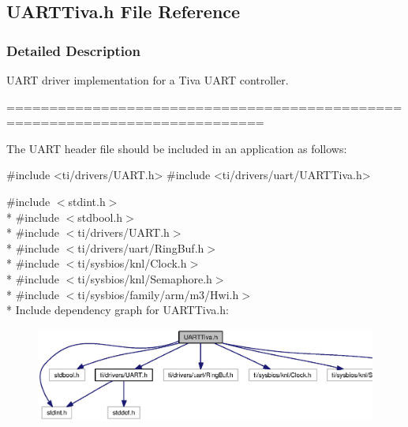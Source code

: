 \subsection{U\+A\+R\+T\+Tiva.\+h File Reference}
\label{_u_a_r_t_tiva_8h}


\subsubsection{Detailed Description}
U\+A\+R\+T driver implementation for a Tiva U\+A\+R\+T controller. 

============================================================================

The U\+A\+R\+T header file should be included in an application as follows\+: 
\begin{DoxyCode}
\textcolor{preprocessor}{#include <ti/drivers/UART.h>}
\textcolor{preprocessor}{#include <ti/drivers/uart/UARTTiva.h>}
\end{DoxyCode}
 

{\ttfamily \#include $<$stdint.\+h$>$}\\*
{\ttfamily \#include $<$stdbool.\+h$>$}\\*
{\ttfamily \#include $<$ti/drivers/\+U\+A\+R\+T.\+h$>$}\\*
{\ttfamily \#include $<$ti/drivers/uart/\+Ring\+Buf.\+h$>$}\\*
{\ttfamily \#include $<$ti/sysbios/knl/\+Clock.\+h$>$}\\*
{\ttfamily \#include $<$ti/sysbios/knl/\+Semaphore.\+h$>$}\\*
{\ttfamily \#include $<$ti/sysbios/family/arm/m3/\+Hwi.\+h$>$}\\*
Include dependency graph for U\+A\+R\+T\+Tiva.\+h\+:
\nopagebreak
\begin{figure}[H]
\begin{center}
\leavevmode
\includegraphics[width=350pt]{_u_a_r_t_tiva_8h__incl}
\end{center}
\end{figure}
